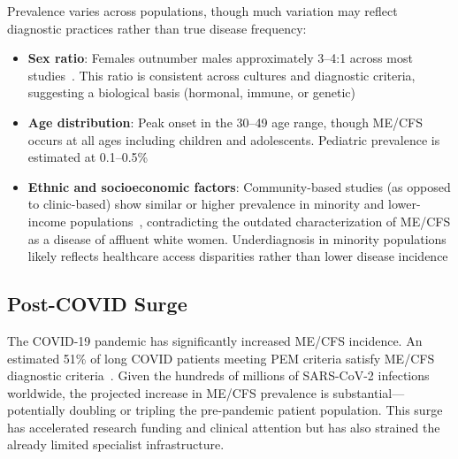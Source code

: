 Prevalence varies across populations, though much variation may reflect diagnostic practices rather than true disease frequency:

\begin{itemize}
    \item \textbf{Sex ratio}: Females outnumber males approximately 3--4:1 across most studies~\cite{jason2018prevalence, Lim2020prevalence}. This ratio is consistent across cultures and diagnostic criteria, suggesting a biological basis (hormonal, immune, or genetic)
    \item \textbf{Age distribution}: Peak onset in the 30--49 age range, though ME/CFS occurs at all ages including children and adolescents. Pediatric prevalence is estimated at 0.1--0.5\%~\cite{Lim2020prevalence}
    \item \textbf{Ethnic and socioeconomic factors}: Community-based studies (as opposed to clinic-based) show similar or higher prevalence in minority and lower-income populations~\cite{jason2018prevalence}, contradicting the outdated characterization of ME/CFS as a disease of affluent white women. Underdiagnosis in minority populations likely reflects healthcare access disparities rather than lower disease incidence
\end{itemize}

\subsection{Post-COVID Surge}

The COVID-19 pandemic has significantly increased ME/CFS incidence. An estimated 51\% of long COVID patients meeting PEM criteria satisfy ME/CFS diagnostic criteria~\cite{Komaroff2023}. Given the hundreds of millions of SARS-CoV-2 infections worldwide, the projected increase in ME/CFS prevalence is substantial---potentially doubling or tripling the pre-pandemic patient population. This surge has accelerated research funding and clinical attention but has also strained the already limited specialist infrastructure.

